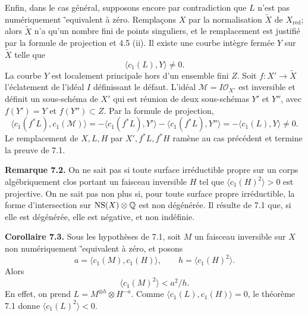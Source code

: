 \documentclass[11pt]{article}
\providecommand{\Q}{\mathbb Q}
\begin{document}
Enfin, dans le cas g\'en\'eral, supposons encore par contradiction que $L$ n'est pas num\'eriquement \='equivalent \`a z\'ero. Rempla\c{c}ons $X$ par la normalisation $\widetilde X$ de $X_{\mathrm{red}}$; alors $\widetilde X$ n'a qu'un nombre fini de points singuliers, et le remplacement est justifi\'e par la formule de projection et 4.5 (ii). Il existe une courbe int\`egre ferm\'ee $Y$ sur $\widetilde X$ telle que
\[
   \langle c_1(L),Y\rangle\ne0.
\]
La courbe $Y$ est localement principale hors d'un ensemble fini $Z$. Soit $f:X'\to\widetilde X$ l'\'eclatement de l'id\'eal $I$ d\'efinissant le d\'efaut. L'id\'eal $\mathcal M=I\mathcal O_{X'}$ est inversible et d\'efinit un sous-sch\'ema de $X'$ qui est r\'eunion de deux sous-sch\'emas $Y'$ et $Y''$, avec $f(Y')=Y$ et $f(Y'')\subset Z$. Par la formule de projection,
\[
 \langle c_1(f^*L),c_1(\mathcal M)\rangle
 =-\langle c_1(f^*L),Y'\rangle-\langle c_1(f^*L),Y''\rangle
 =-\langle c_1(L),Y\rangle\ne0.
\]
Le remplacement de $X,L,H$ par $X',f^*L,f^*H$ ram\`ene au cas pr\'ec\'edent et termine la preuve de 7.1.

\textbf{Remarque 7.2.} On ne sait pas si toute surface irr\'eductible propre sur un corps alg\'ebriquement clos portant un faisceau inversible $H$ tel que $\langle c_1(H)^2\rangle>0$ est projective. On ne sait pas non plus si, pour toute surface propre irr\'eductible, la forme d'intersection sur $\NS(X)\otimes\Q$ est non d\'eg\'en\'er\'ee. Il r\'esulte de 7.1 que, si elle est d\'eg\'en\'er\'ee, elle est n\'egative, et non ind\'efinie.

\textbf{Corollaire 7.3.} Sous les hypoth\`eses de 7.1, soit $M$ un faisceau inversible sur $X$ non num\'eriquement \='equivalent \`a z\'ero, et posons
\[
   a=\langle c_1(M),c_1(H)\rangle,
   \qquad
   h=\langle c_1(H)^2\rangle.
\]
Alors
\[
   \langle c_1(M)^2\rangle<a^2/h.
\]
En effet, on prend $L=M^{\otimes h}\otimes H^{-a}$. Comme $\langle c_1(L),c_1(H)\rangle=0$, le th\'eor\`eme 7.1 donne $\langle c_1(L)^2\rangle<0$.
\end{document}
